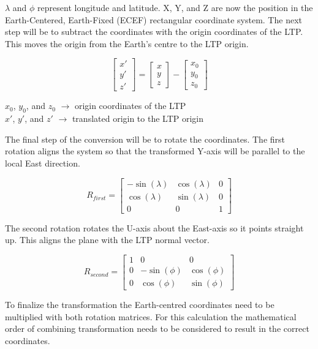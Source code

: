 $\lambda$ and $\phi$ represent longitude and latitude. X, Y, and Z are now the position in the Earth-Centered, Earth-Fixed (ECEF) rectangular coordinate system. The next step will be to subtract the coordinates with the origin coordinates of the LTP\@. This moves the origin from the Earth's centre to the LTP origin. 

\[
\begin{bmatrix}
x' \\ y' \\ z' 
\end{bmatrix}
=
\begin{bmatrix}
x \\ y \\ z
\end{bmatrix}
-
\begin{bmatrix}
x_0 \\ y_0 \\ z_0
\end{bmatrix}
\]

$x_0$, $y_0$, and $z_0$ $\xrightarrow{}$ origin coordinates of the LTP \\
$x'$, $y'$, and $z'$ $\xrightarrow{}$ translated origin to the LTP origin \\

\noindent\cite{Web:65}

The final step of the conversion will be to rotate the coordinates. The first rotation aligns the system so that the transformed Y-axis will be parallel to the local East direction.

\[
R_{first} = 
\begin{bmatrix}
-\sin(\lambda) & \cos(\lambda) & 0 \\
\cos(\lambda) & \sin(\lambda) & 0 \\
0 & 0 & 1
\end{bmatrix}
\]

The second rotation rotates the U-axis about the East-axis so it points straight up. This aligns the plane with the LTP normal vector.

\[R_{second} = 
\begin{bmatrix}
1 & 0 & 0 \\
0  & -\sin(\phi) & \cos(\phi) \\
0 & \cos(\phi) & \sin(\phi)
\end{bmatrix}
\]

To finalize the transformation the Earth-centred coordinates need to be multiplied with both rotation matrices. For this calculation the mathematical order of combining transformation needs to be considered to result in the correct coordinates.

